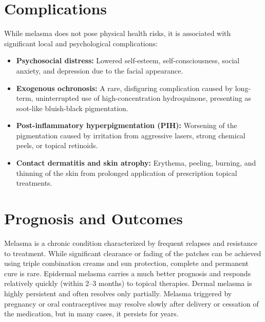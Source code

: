 \section*{Complications}
While melasma does not pose physical health risks, it is associated with significant local and psychological complications:
\begin{itemize}
    \item \textbf{Psychosocial distress:} Lowered self-esteem, self-consciousness, social anxiety, and depression due to the facial appearance.
    \item \textbf{Exogenous ochronosis:} A rare, disfiguring complication caused by long-term, uninterrupted use of high-concentration hydroquinone, presenting as soot-like bluish-black pigmentation.
    \item \textbf{Post-inflammatory hyperpigmentation (PIH):} Worsening of the pigmentation caused by irritation from aggressive lasers, strong chemical peels, or topical retinoids.
    \item \textbf{Contact dermatitis and skin atrophy:} Erythema, peeling, burning, and thinning of the skin from prolonged application of prescription topical treatments.
\end{itemize}

\section*{Prognosis and Outcomes}
Melasma is a chronic condition characterized by frequent relapses and resistance to treatment. While significant clearance or fading of the patches can be achieved using triple combination creams and sun protection, complete and permanent cure is rare. Epidermal melasma carries a much better prognosis and responds relatively quickly (within 2--3 months) to topical therapies. Dermal melasma is highly persistent and often resolves only partially. Melasma triggered by pregnancy or oral contraceptives may resolve slowly after delivery or cessation of the medication, but in many cases, it persists for years.

